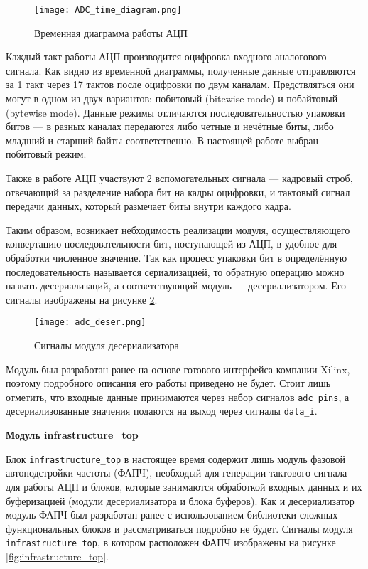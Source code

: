\begin{figure}[ht]
    \centering
    \texttt{[image: ADC\_time\_diagram.png]}
    \caption{Временная диаграмма работы АЦП}
    \label{fig:ADC_time_diagram}
\end{figure}
Каждый такт работы АЦП производится оцифровка входного аналогового сигнала. Как видно из временной диаграммы, полученные данные отправляются за 1 такт через 17 тактов после оцифровки по двум каналам. Предствляться они могут в одном из двух вариантов: побитовый (bitewise mode) и побайтовый (bytewise mode). Данные режимы отличаются последовательностью упаковки битов --- в разных каналах передаются либо четные и нечётные биты, либо младший и старший байты соответственно. В настоящей работе выбран побитовый режим.\par
Также в работе АЦП участвуют 2 вспомогательных сигнала --- кадровый строб, отвечающий за разделение набора бит на кадры оцифровки, и тактовый сигнал передачи данных, который размечает биты внутри каждого кадра.\par
Таким образом, возникает небходимость реализации модуля, осуществляющего конвертацию последовательности бит, поступающей из АЦП, в удобное для обработки численное значение. Так как процесс упаковки бит в определённую последовательность называется сериализацией, то обратную операцию можно назвать десериализаций, а соответствующий модуль --- десериализатором. Его сигналы изображены на рисунке \ref{fig:adc_deser}.\par
\begin{figure}[ht]
    \centering
    \texttt{[image: adc\_deser.png]}
    \caption{Сигналы модуля десериализатора}
    \label{fig:adc_deser}
\end{figure}
Модуль был разработан ранее на основе готового интерфейса компании Xilinx, поэтому подробного описания его работы приведено не будет. Стоит лишь отметить, что входные данные принимаются через набор сигналов \texttt{adc\_pins}, а десериализованные значения подаются на выход через сигналы \texttt{data\_i}.\par
\textbf{Модуль infrastructure\_top}\par
Блок \texttt{infrastructure\_top} в настоящее время содержит лишь модуль фазовой автоподстройки частоты (ФАПЧ), необходый для генерации тактового сигнала для работы АЦП и блоков, которые занимаются обработкой входных данных и их буферизацией (модули десериализатора и блока буферов). Как и десериализатор модуль ФАПЧ был разработан ранее с использованием библиотеки сложных функциональных блоков и рассматриваться подробно не будет. Сигналы модуля \texttt{infrastructure\_top}, в котором расположен ФАПЧ изображены на рисунке \ref{fig:infrastructure_top}.\par
